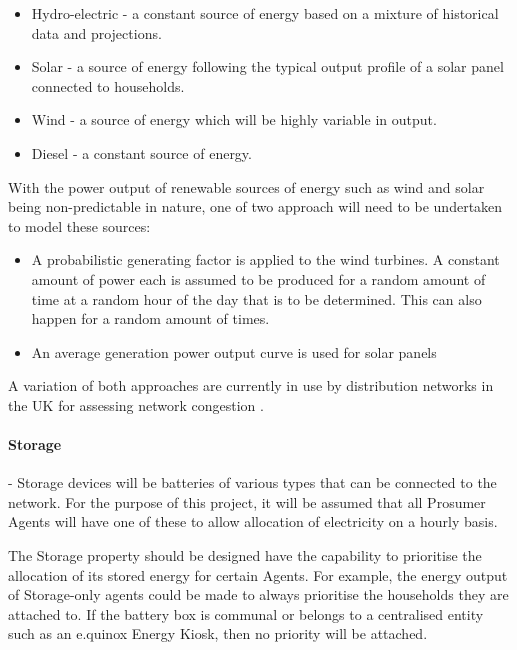 \begin{itemize}
  \item Hydro-electric - a constant source of energy based on a mixture of historical data and projections.
  \item Solar - a source of energy following the typical output profile of a solar panel connected to households.
  \item Wind - a source of energy which will be highly variable in output.
  \item Diesel - a constant source of energy.
\end{itemize}

With the power output of renewable sources of energy such as wind and solar being non-predictable in nature, one of two approach will need to be undertaken to model these sources:
\begin{itemize}
  
  \item A probabilistic generating factor is applied to the wind turbines. A constant amount of power each is assumed to be produced for a random amount of time at a random hour of the day that is to be determined. This can also happen for a random amount of times.
  
  \item An average generation power output curve is used for solar panels

\end{itemize}

A variation of both approaches are currently in use by distribution networks in the UK for assessing network congestion \cite{IPSA-web-constraint:2015}. \

\paragraph*{Storage} - Storage devices will be batteries of various types that can be connected to the network. For the purpose of this project, it will be assumed that all Prosumer Agents will have one of these to allow allocation of electricity on a hourly basis.

The Storage property should be designed have the capability to prioritise the allocation of its stored energy for certain Agents. For example, the energy output of Storage-only agents could be made to always prioritise the households they are attached to. If the battery box is communal or belongs to a centralised entity such as an e.quinox Energy Kiosk, then no priority will be attached.

